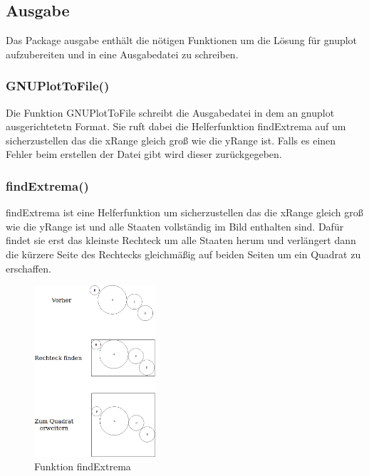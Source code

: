 \pagebreak

\subsection{Ausgabe}

Das Package ausgabe enthält die nötigen Funktionen um die Lösung für gnuplot aufzubereiten und in eine Ausgabedatei zu schreiben.

\subsubsection{GNUPlotToFile()}

Die Funktion GNUPlotToFile schreibt die Ausgabedatei in dem an gnuplot ausgerichtetetn Format.
Sie ruft dabei die Helferfunktion findExtrema auf um sicherzustellen das die xRange gleich groß wie die yRange ist.
Falls es einen Fehler beim erstellen der Datei gibt wird dieser zurückgegeben.

\subsubsection{findExtrema()}

findExtrema ist eine Helferfunktion um sicherzustellen das die xRange gleich groß wie die yRange ist und alle Staaten vollständig im Bild enthalten sind.
Dafür findet sie erst das kleinste Rechteck um alle Staaten herum und verlängert dann die kürzere Seite des Rechtecks gleichmäßig auf beiden Seiten um ein Quadrat zu erschaffen.

\begin{figure}[htb]
    \centering
    \includegraphics[width=0.4\textwidth,]{findExtrema.png}
    \caption[]{Funktion findExtrema}
\end{figure}
